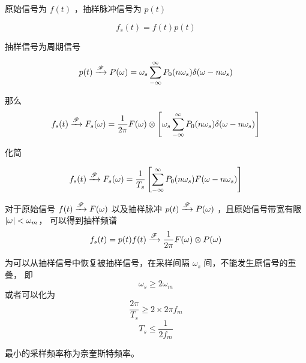 \documentclass[cn,11pt,chinese,black,simple]{../elegantbook}
\begin{document}
原始信号为 \(f(t)\) ，抽样脉冲信号为 \(p(t)\) 

\[f_s(t) = f(t) p(t)\]

抽样信号为周期信号 

\[p(t) \xrightarrow{\mathscr{F}} P(\omega) = \omega_s \displaystyle\sum_{-\infty}^{\infty}P_0(n \omega_s) \delta(\omega - n\omega_s)\]

那么
\[f_s(t) \xrightarrow{\mathscr{F}} F_s(\omega) = \dfrac{1}{2\pi}F(\omega) \otimes \left[\omega_s \displaystyle\sum_{-\infty}^{\infty}P_0(n \omega_s) \delta(\omega-n\omega_s)\right]\]

化简

\[f_s(t) \xrightarrow{\mathscr{F}} F_s(\omega) = \dfrac{1}{T_s} \left[ \displaystyle\sum_{-\infty}^{\infty}P_0(n \omega_s) F(\omega-n\omega_s)\right]\]

\begin{theorem}[时域抽样定理]
  对于原始信号 \(f(t) \xrightarrow{\mathscr{F}} F(\omega)\) 以及抽样脉冲 \(p(t) \xrightarrow{\mathscr{F}} P(\omega)\) ，且原始信号带宽有限 \(\left| \omega \right| < \omega_m\)，
  可以得到抽样频谱 
  \[f_s(t) = p(t) f(t) \xrightarrow{\mathscr{F}} \dfrac{1}{2 \pi} F(\omega) \otimes P(\omega)\]

  为可以从抽样信号中恢复被抽样信号，在采样间隔 \(\omega_s\) 间，不能发生原信号的重叠，
  即
  \[\omega_s \geq 2 \omega_m\]
  或者可以化为 
  \[\dfrac{2\pi}{T_s} \geq 2 \times 2  \pi f_m\]
  \[T_s \leq \dfrac{1}{2 f_m}\]

  最小的采样频率称为奈奎斯特频率。
\end{theorem}




\ifx\mainclass\undefined
\end{document}
